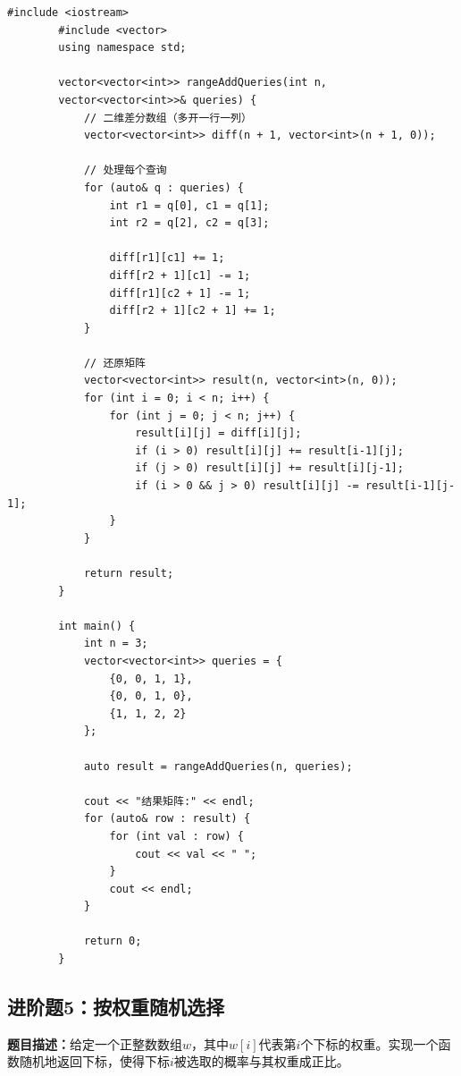 \documentclass[12pt,a4paper]{article}
\begin{document}
	\begin{lstlisting}[caption={进阶题4：区间加法 II - 二维差分}]
		#include <iostream>
		#include <vector>
		using namespace std;
		
		vector<vector<int>> rangeAddQueries(int n, 
		vector<vector<int>>& queries) {
			// 二维差分数组（多开一行一列）
			vector<vector<int>> diff(n + 1, vector<int>(n + 1, 0));
			
			// 处理每个查询
			for (auto& q : queries) {
				int r1 = q[0], c1 = q[1];
				int r2 = q[2], c2 = q[3];
				
				diff[r1][c1] += 1;
				diff[r2 + 1][c1] -= 1;
				diff[r1][c2 + 1] -= 1;
				diff[r2 + 1][c2 + 1] += 1;
			}
			
			// 还原矩阵
			vector<vector<int>> result(n, vector<int>(n, 0));
			for (int i = 0; i < n; i++) {
				for (int j = 0; j < n; j++) {
					result[i][j] = diff[i][j];
					if (i > 0) result[i][j] += result[i-1][j];
					if (j > 0) result[i][j] += result[i][j-1];
					if (i > 0 && j > 0) result[i][j] -= result[i-1][j-1];
				}
			}
			
			return result;
		}
		
		int main() {
			int n = 3;
			vector<vector<int>> queries = {
				{0, 0, 1, 1},
				{0, 0, 1, 0},
				{1, 1, 2, 2}
			};
			
			auto result = rangeAddQueries(n, queries);
			
			cout << "结果矩阵:" << endl;
			for (auto& row : result) {
				for (int val : row) {
					cout << val << " ";
				}
				cout << endl;
			}
			
			return 0;
		}
	\end{lstlisting}
	
	\subsection{进阶题5：按权重随机选择}
	
	\textbf{题目描述：}给定一个正整数数组$w$，其中$w[i]$代表第$i$个下标的权重。实现一个函数随机地返回下标，使得下标$i$被选取的概率与其权重成正比。
	
\end{document}
